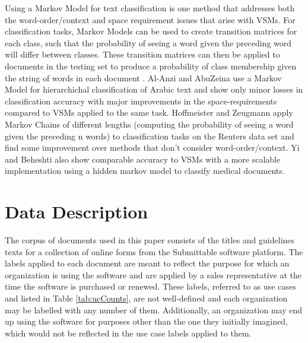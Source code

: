\documentclass{article}
\begin{document}
Using a Markov Model for text classification is one method that addresses both the word-order/context and space requirement issues that arise with VSMs. For classification tasks, Markov Models can be used to create transition matrices for each class, such that the probability of seeing a word given the preceding word will differ between classes. These transition matrices can then be applied to documents in the testing set to produce a probability of class membership given the string of words in each document \cite{textMining}. Al-Anzi and AbuZeina \cite{arabic} use a Markov Model for hierarchichal classification of Arabic text and show only minor losses in classification accuracy with major improvements in the space-requirements compared to VSMs applied to the same task. Hoffmeister and Zeugmann \cite{textMining} apply Markov Chains of different lengths (computing the probability of seeing a word given the preceding n words) to classification tasks on the Reuters data set and find some improvement over methods that don't consider word-order/context. Yi and Beheshti \cite{hmmMed} also show comparable accuracy to VSMs with a more scalable implementation using a hidden markov model to classify medical documents.


\section{Data Description}
The corpus of documents used in this paper consists of the titles and guidelines texts for a collection of online forms from the Submittable software platform. The labels applied to each document are meant to reflect the purpose for which an organization is using the software and are applied by a sales representative at the time the software is purchased or renewed. These labels, referred to as use cases and listed in Table \ref{tab:ucCounts}, are not well-defined and each organization may be labelled with any number of them. Additionally, an organization may end up using the software for purposes other than the one they initially imagined, which would not be reflected in the use case labels applied to them.
\end{document}
